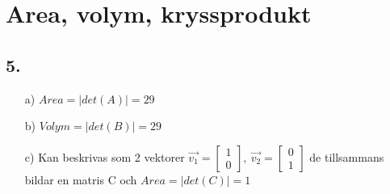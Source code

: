 \documentclass{article}
\begin{document}
\section*{Area, volym, kryssprodukt}
\subsection*{5.}
\begin{itemize}
	\item[a) ] $Area = |det(A)| = 29$
	\item[b) ] $Volym = |det(B)| = 29$
	\item[c) ] Kan beskrivas som 2 vektorer $\vec{v_1}=\begin{bmatrix}1\\0\end{bmatrix},\ \vec{v_2}=\begin{bmatrix}0\\1\end{bmatrix}$ de tillsammans bildar en matris C och $Area = |det(C)| = 1$
\end{itemize}
\end{document}
